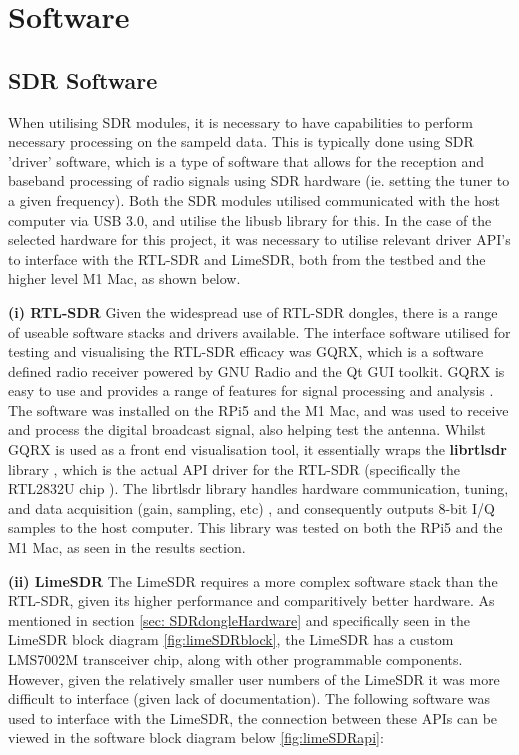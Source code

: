 \section{Software}

\subsection{SDR Software \label{sec:SDRsoftware}}
When utilising SDR modules, it is necessary to have capabilities to perform necessary processing on the sampeld data. This is typically done using SDR 'driver' software, which is a type of software that allows for the reception and baseband processing of radio signals using SDR hardware (ie. setting the tuner to a given frequency). Both the SDR modules utilised communicated with the host computer via USB 3.0, and utilise the libusb library for this. In the case of the selected hardware for this project, it was necessary to utilise relevant driver API's to interface with the RTL-SDR and LimeSDR, both from the testbed and the higher level M1 Mac, as shown below.

\vspace{0.5cm} \noindent 
\textbf{(i) RTL-SDR} Given the widespread use of RTL-SDR dongles, there is a range of useable software stacks and drivers available. The interface software utilised for testing and visualising the RTL-SDR efficacy was GQRX, which is a software defined radio receiver powered by GNU Radio and the Qt GUI toolkit. GQRX is easy to use and provides a range of features for signal processing and analysis \cite{RTLSDRchipSet}. The software was installed on the RPi5 and the M1 Mac, and was used to receive and process the digital broadcast signal, also helping test the antenna. Whilst GQRX is used as a front end visualisation tool, it essentially wraps the \textbf{librtlsdr} library \cite{librtlsdr}, which is the actual API driver for the RTL-SDR (specifically the RTL2832U chip \cite{RTLSDRspecs}). The librtlsdr library handles hardware communication, tuning, and data acquisition (gain, sampling, etc) \cite{librtlsdr}, and consequently outputs 8-bit I/Q samples to the host computer. This library was tested on both the RPi5 and the M1 Mac, as seen in the results section.

\vspace{0.5cm} \noindent 
\textbf{(ii) LimeSDR} The LimeSDR requires a more complex software stack than the RTL-SDR, given its higher performance and comparitively better hardware. As mentioned in section \ref{sec: SDRdongleHardware} and specifically seen in the LimeSDR block diagram \ref{fig:limeSDRblock}, the LimeSDR has a custom LMS7002M transceiver chip, along with other programmable components. However, given the relatively smaller user numbers of the LimeSDR it was more difficult to interface (given lack of documentation). The following software was used to interface with the LimeSDR, the connection between these APIs can be viewed in the software block diagram below \ref{fig:limeSDRapi}:

